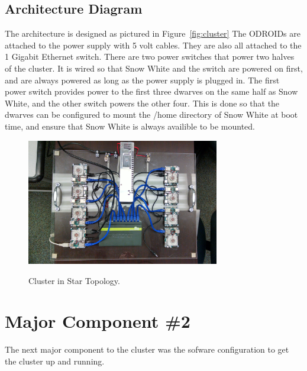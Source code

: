 \subsection{Architecture  Diagram}

The architecture is designed as pictured in Figure~\ref{fig:cluster} The ODROIDs are attached to the power supply with 5 volt cables. They are also all attached to the 1 Gigabit Ethernet switch. There are two power switches that power two halves of the cluster. It is wired so that Snow White and the switch are powered on first, and are always powered as long as the power supply is plugged in. The first power switch provides power to the first three dwarves on the same half as Snow White, and the other switch powers the other four. This is done so that the dwarves can be configured to mount the /home directory of Snow White at boot time, and ensure that Snow White is always availible to be mounted.

 \begin{figure}[tbh]
	\caption{Cluster in Star Topology.}
	\centering
		\includegraphics[width=0.75\textwidth]{IMG_20151201_104751350_HDR.jpg}
	\label{fig:ring}
\end{figure}


\section{Major Component \#2 }

The next major component to the cluster was the sofware configuration to get the cluster up and running.

